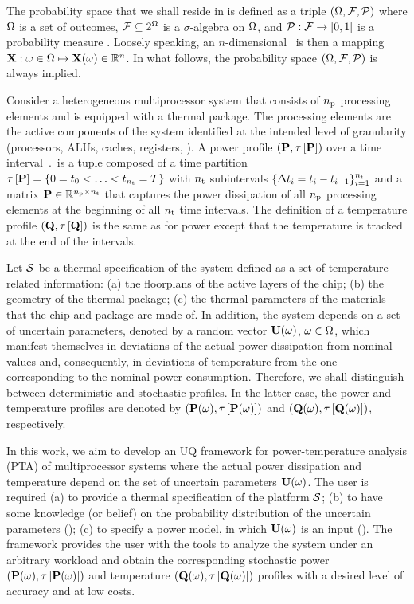 The probability space that we shall reside in is defined as a triple $(\Omega, \mathcal{F}, \mathcal{P})$ where $\Omega$ is a set of outcomes, $\mathcal{F} \subseteq 2^\Omega$ is a $\sigma$-algebra on $\Omega$, and $\mathcal{P}: \mathcal{F} \to [0, 1]$ is a probability measure \cite{maitre2010}.
Loosely speaking, an $n$-dimensional \rv\ is then a mapping $\mathbf{X}: \omega \in \Omega \mapsto \mathbf{X}(\omega) \in \mathbb{R}^n$.
In what follows, the probability space $(\Omega, \mathcal{F}, \mathcal{P})$ is always implied.

Consider a heterogeneous multiprocessor system that consists of ${n_\text{p}}$ processing elements and is equipped with a thermal package.
The processing elements are the active components of the system identified at the intended level of granularity (processors, ALUs, caches, registers, \etc).
A power profile $\profP$ over a time interval $\period$ is a tuple composed of a time partition $\part{\mP} = \{ 0 = \t_0 < \dotsc < \t_{\nsteps} = \period \}$ with ${n_\text{t}}$ subintervals $\{ \Delta t_i = t_i - t_{i - 1} \}_{i = 1}^{{n_\text{t}}}$ and a matrix $\mP \in \real^{\nprocs \times \nsteps}$ that captures the power dissipation of all ${n_\text{p}}$ processing elements at the beginning of all ${n_\text{t}}$ time intervals.
The definition of a temperature profile $\profT$ is the same as for power except that the temperature is tracked at the end of the intervals.

Let $\mathcal{S}$ be a thermal specification of the system defined as a set of temperature-related information: (a) the floorplans of the active layers of the chip; (b) the geometry of the thermal package; (c) the thermal parameters of the materials that the chip and package are made of.
In addition, the system depends on a set of uncertain parameters, denoted by a random vector $\mathbf{U}(\omega)$, $\omega \in \Omega$, which manifest themselves in deviations of the actual power dissipation from nominal values and, consequently, in deviations of temperature from the one corresponding to the nominal power consumption.
Therefore, we shall distinguish between deterministic and stochastic profiles.
In the latter case, the power and temperature profiles are denoted by $\profP{\o}$ and $\profT{\o}$, respectively.

In this work, we aim to develop an UQ framework for power-temperature analysis (PTA) of multiprocessor systems where the actual power dissipation and temperature depend on the set of uncertain parameters $\mathbf{U}(\omega)$.
The user is required (a) to provide a thermal specification of the platform $\mathcal{S}$; (b) to have some knowledge (or belief) on the probability distribution of the uncertain parameters (); (c) to specify a power model, in which $\mathbf{U}(\omega)$ is an input ().
The framework provides the user with the tools to analyze the system under an arbitrary workload and obtain the corresponding stochastic power $\profP{\o}$ and temperature $\profT{\o}$ profiles with a desired level of accuracy and at low costs.
